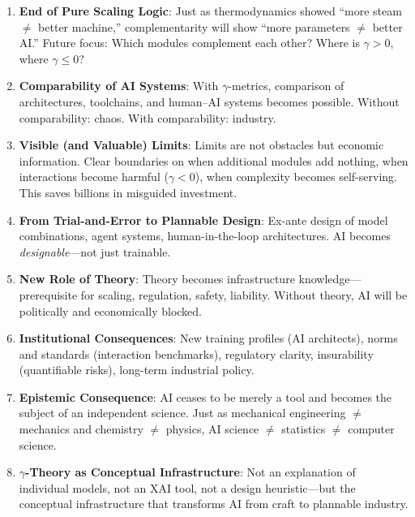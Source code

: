 \begin{enumerate}
    \item \textbf{End of Pure Scaling Logic}: Just as thermodynamics showed
    ``more steam $\neq$ better machine,'' complementarity will show
    ``more parameters $\neq$ better AI.'' Future focus: Which modules complement
    each other? Where is $\gamma > 0$, where $\gamma \leq 0$?

    \item \textbf{Comparability of AI Systems}: With $\gamma$-metrics, comparison
    of architectures, toolchains, and human--AI systems becomes possible.
    Without comparability: chaos. With comparability: industry.

    \item \textbf{Visible (and Valuable) Limits}: Limits are not obstacles but
    economic information. Clear boundaries on when additional modules add nothing,
    when interactions become harmful ($\gamma < 0$), when complexity becomes
    self-serving. This saves billions in misguided investment.

    \item \textbf{From Trial-and-Error to Plannable Design}: Ex-ante design of
    model combinations, agent systems, human-in-the-loop architectures.
    AI becomes \textit{designable}---not just trainable.

    \item \textbf{New Role of Theory}: Theory becomes infrastructure knowledge---
    prerequisite for scaling, regulation, safety, liability. Without theory,
    AI will be politically and economically blocked.

    \item \textbf{Institutional Consequences}: New training profiles (AI architects),
    norms and standards (interaction benchmarks), regulatory clarity,
    insurability (quantifiable risks), long-term industrial policy.

    \item \textbf{Epistemic Consequence}: AI ceases to be merely a tool and becomes
    the subject of an independent science. Just as mechanical engineering $\neq$
    mechanics and chemistry $\neq$ physics, AI science $\neq$ statistics $\neq$
    computer science.

    \item \textbf{$\gamma$-Theory as Conceptual Infrastructure}: Not an explanation
    of individual models, not an XAI tool, not a design heuristic---but the
    conceptual infrastructure that transforms AI from craft to plannable industry.
\end{enumerate}

